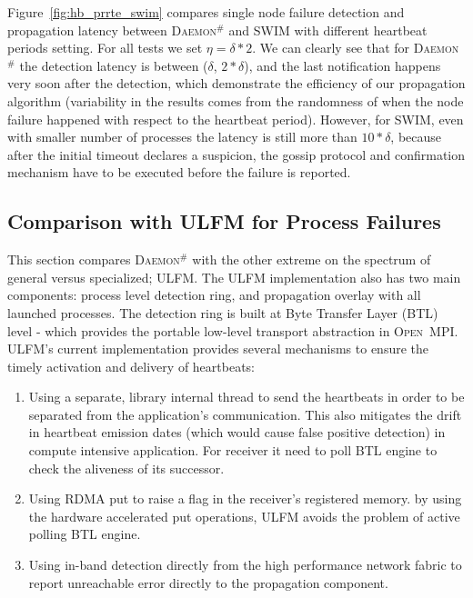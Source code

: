 \documentclass[sigconf]{acmart}
\newcommand{\ompi}[0]{\textsc{Open~MPI}\xspace}
\newcommand{\ulfm}[0]{\textsc{ULFM}\xspace}
\newcommand{\ourwork}[0]{\textsc{Daemon}\ensuremath{^\#}\xspace}
\begin{document}
Figure~\ref{fig:hb_prrte_swim} compares single node failure detection and propagation latency between \ourwork and SWIM
with different heartbeat periods setting. For all tests we set $ \eta = \delta * 2 $. We can clearly see that for \ourwork the detection latency is between ($\delta$, $2*\delta$), and the last notification happens very soon after the detection, which demonstrate the efficiency of our propagation algorithm (variability in the results comes from the randomness of when the node failure happened with respect to the heartbeat period). However, for SWIM, even with smaller number of processes the latency is still more than $10*\delta$, because after the initial timeout declares a suspicion, the gossip protocol and confirmation mechanism have to be executed 
before the failure is reported.

\subsection{Comparison with \ulfm for Process Failures}
This section compares \ourwork with the other extreme on the spectrum of 
general versus specialized; \ulfm. The \ulfm implementation also has two
 main components: process level detection ring, and propagation overlay with all launched processes. The detection ring is built at Byte Transfer Layer (BTL) level - which provides the portable low-level transport abstraction in \ompi. \ulfm's current implementation provides several mechanisms to ensure the timely activation and delivery of heartbeats:
\begin{enumerate}
  \item Using a separate, library internal thread to send the heartbeats in order to be separated from the application's communication. This also mitigates the drift in heartbeat 
  emission dates (which would cause false positive detection) in compute intensive application. 
  For receiver it need to poll BTL engine to check the aliveness of its successor. 
  \item Using RDMA put to raise a flag in the receiver's registered memory. by using the hardware accelerated put operations, \ulfm avoids the problem of active polling BTL engine. 
  \item Using in-band detection directly from the high performance network 
  fabric to report unreachable error directly to the propagation component.
\end{enumerate}
\end{document}
